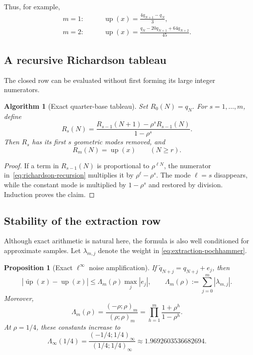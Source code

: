 \documentclass[11pt,a4paper]{article}
\newtheorem{proposition}[theorem]{Proposition}
\newtheorem{algorithm}[theorem]{Algorithm}
\theoremstyle{remark}
\newcommand{\up}{\operatorname{up}}
\newcommand{\abs}[1]{\left|#1\right|}
\begin{document}
Thus, for example,
\begin{align}
 m=1:&\qquad \up(x)=\frac{4q_{N+1}-q_N}{3},
 \label{eq:m1-row}\\
 m=2:&\qquad \up(x)=\frac{q_N-20q_{N+1}+64q_{N+2}}{45}.
 \label{eq:m2-row}
\end{align}

\subsection{A recursive Richardson tableau}

The closed row can be evaluated without first forming its large integer
numerators.

\begin{algorithm}[Exact quarter-base tableau]
\label{alg:richardson-tableau}
Set $R_0(N)=q_N$.  For $s=1,\ldots,m$, define
\begin{equation}
 R_s(N)=\frac{R_{s-1}(N+1)-\rho^sR_{s-1}(N)}{1-\rho^s}.
 \label{eq:richardson-recursion}
\end{equation}
Then $R_s$ has its first $s$ geometric modes removed, and
\begin{equation}
 R_m(N)=\up(x)
 \qquad(N\ge r).
 \label{eq:richardson-final}
\end{equation}
\end{algorithm}

\begin{proof}
If a term in $R_{s-1}(N)$ is proportional to $\rho^{\ell N}$, the numerator
in~\eqref{eq:richardson-recursion} multiplies it by
$\rho^\ell-\rho^s$.  The mode $\ell=s$ disappears, while the constant mode is
multiplied by $1-\rho^s$ and restored by division.  Induction proves the
claim.
\end{proof}

\subsection{Stability of the extraction row}

Although exact arithmetic is natural here, the formula is also well
conditioned for approximate samples.  Let $\lambda_{m,j}$ denote the weight in
\eqref{eq:extraction-pochhammer}.

\begin{proposition}[Exact $\ell^\infty$ noise amplification]
\label{prop:conditioning}
If $\widetilde q_{N+j}=q_{N+j}+e_j$, then
\begin{equation}
 \abs{\widetilde{\up}(x)-\up(x)}
 \le \Lambda_m(\rho)\max_j|e_j|,
 \qquad
 \Lambda_m(\rho):=\sum_{j=0}^{m}|\lambda_{m,j}|.
 \label{eq:noise-bound}
\end{equation}
Moreover,
\begin{equation}
 \boxed{
 \Lambda_m(\rho)=\frac{(-\rho;\rho)_m}{(\rho;\rho)_m}
 =\prod_{h=1}^{m}\frac{1+\rho^h}{1-\rho^h}. }
 \label{eq:condition-qpoch}
\end{equation}
At $\rho=1/4$, these constants increase to
\begin{equation}
 \Lambda_\infty(1/4)
 =\frac{(-1/4;1/4)_\infty}{(1/4;1/4)_\infty}
 \approx1.9692603536682694.
 \label{eq:condition-limit}
\end{equation}
\end{proposition}
\end{document}
